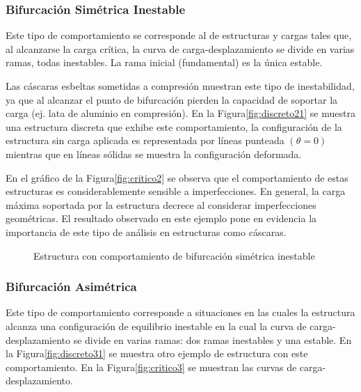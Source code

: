 \subsubsection{Bifurcación Simétrica Inestable}

Este tipo de comportamiento se corresponde al de estructuras y cargas tales que, al alcanzarse la carga crítica, la curva de carga-desplazamiento se divide en varias ramas, todas inestables. La rama inicial (fundamental) es la única estable.

Las cáscaras esbeltas sometidas a compresión muestran este tipo de inestabilidad, ya que al alcanzar el punto de bifurcación pierden la capacidad de soportar la carga (ej. lata de aluminio en compresión). En la Figura\autoref{fig:discreto21} se muestra una estructura discreta que exhibe este comportamiento, la configuración de la estructura sin carga aplicada es representada por líneas punteada $(\theta = 0)$ mientras que en líneas sólidas se muestra la configuración deformada.

En el gráfico de la Figura\autoref{fig:critico2} se observa que el comportamiento de estas estructuras es considerablemente sensible a imperfecciones. En general, la carga máxima soportada por la estructura decrece al considerar imperfecciones geométricas. El resultado observado en este ejemplo pone en evidencia la importancia de este tipo de análisis en estructuras como cáscaras.
\begin{figure}[htb]
	\centering
{}
\hspace{1em}
\caption{Estructura con comportamiento de bifurcación simétrica inestable}
	\label{fig:simetrica2}
\end{figure}

\subsubsection{Bifurcación Asimétrica}

Este tipo de comportamiento corresponde a situaciones en las cuales la estructura alcanza una configuración de equilibrio inestable en la cual la curva de carga-desplazamiento se divide en varias ramas: dos ramas inestables y una estable. En la
Figura\autoref{fig:discreto31} se muestra otro ejemplo de estructura con este comportamiento. En la Figura\autoref{fig:critico3} se muestran las curvas de carga-desplazamiento.

